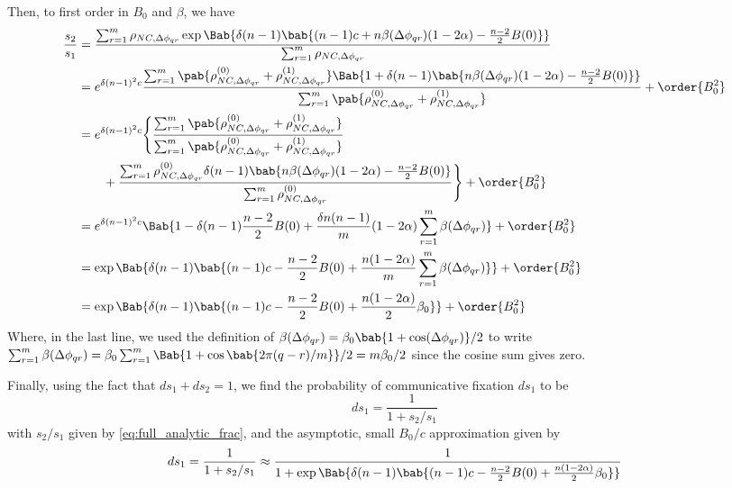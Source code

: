 Then, to first order in $B_0$ and $\beta$,
we have
\begin{align*}
  \frac{s_2}{s_1}
  &=
  \frac
  {\sum_{r=1}^{m} \rho_{NC,\Delta \phi_{qr}}
    \exp \Bab{
      \delta (n-1)
      \bab{
        (n-1) c + n \beta(\Delta \phi_{qr}) (1 - 2 \alpha)
        - \frac{n-2}{2} B(0)
      }
    }
  }
  {\sum_{r=1}^{m} \rho_{NC,\Delta \phi_{qr}}}
  \\
  &=
  e^{\delta (n-1)^2 c}
  \frac
  {\sum_{r=1}^{m}
    \pab{
      \rho_{NC,\Delta \phi_{qr}}^{(0)}
      +
      \rho_{NC,\Delta \phi_{qr}}^{(1)}
    }
    \Bab{1 +
      \delta (n-1)
      \bab{
        n \beta(\Delta \phi_{qr}) (1 - 2 \alpha)
        - \frac{n-2}{2} B(0)
      }
    }
  }
  {\sum_{r=1}^{m} \pab{
    \rho_{NC,\Delta \phi_{qr}}^{(0)}
    +
    \rho_{NC,\Delta \phi_{qr}}^{(1)}
  }}
  + \order{B_0^2}
  \\
  &=
  e^{\delta (n-1)^2 c}
  \Biggl\{
  \frac
  {\sum_{r=1}^{m}
    \pab{
      \rho_{NC,\Delta \phi_{qr}}^{(0)}
      +
      \rho_{NC,\Delta \phi_{qr}}^{(1)}
    }
  }
  {\sum_{r=1}^{m} \pab{
    \rho_{NC,\Delta \phi_{qr}}^{(0)}
    +
    \rho_{NC,\Delta \phi_{qr}}^{(1)}
  }}
  \\
  &\qquad
  +
  \frac
  {\sum_{r=1}^{m} \rho_{NC,\Delta \phi_{qr}}^{(0)}
    \delta (n-1)
    \bab{
      n \beta(\Delta \phi_{qr}) (1 - 2 \alpha)
      - \frac{n-2}{2} B(0)
    }
  }
  {\sum_{r=1}^{m} \rho_{NC,\Delta \phi_{qr}}^{(0)}
  }
  \Biggr\}
  + \order{B_0^2}
  \\
  &=
  e^{\delta (n-1)^2 c}
  \Bab{
    1
    - \delta (n-1) \frac{n-2}{2} B(0)
    +
    \frac{\delta n (n-1)}{m} (1 - 2 \alpha)
    \sum_{r=1}^{m} \beta(\Delta \phi_{qr})
  }
  + \order{B_0^2}
  \\
  &=
  \exp \Bab{\delta (n-1) \bab{
    (n-1) c
    - \frac{n-2}{2} B(0)
    +
    \frac{n (1 - 2 \alpha)}{m}
    \sum_{r=1}^{m} \beta(\Delta \phi_{qr})
  }}
  + \order{B_0^2}
  \\
  &=
  \exp \Bab{ \delta (n-1) \bab{
    (n-1) c
    - \frac{n-2}{2} B(0)
    +
    \frac{n (1 - 2 \alpha)}{2} \beta_0
  }}
  + \order{B_0^2}
\end{align*}
Where, in the last line, we used
the definition of
$\beta(\Delta \phi_{qr}) = \beta_0 \bab{1 + \cos(\Delta \phi_{qr})}/2$
to write
$\sum_{r=1}^m \beta(\Delta \phi_{qr})
= \beta_0 \sum_{r=1}^m \Bab{1 + \cos\bab{2 \pi (q-r)/m}}/2
= m \beta_0/2$
since the cosine sum gives zero.

Finally, using the fact that $d s_1 + d s_2 = 1$, we find the probability
of communicative fixation $d s_1$ to be
\begin{equation}
  d s_1 = \frac{1}{1 + s_2/s_1}
  \label{eq:full_analytic}
\end{equation}
with $s_2/s_1$ given by \cref{eq:full_analytic_frac},
and the asymptotic, small $B_0/c$ approximation given by
\begin{equation}
  d s_1 = \frac{1}{1 + s_2/s_1}
  \approx
  \frac{1}
  {1 + \exp \Bab{\delta (n-1) \bab{
    (n-1) c
    - \frac{n-2}{2} B(0)
    +
    \frac{n (1 - 2 \alpha)}{2} \beta_0
    }}
  }
  \label{eq:analytic_first_term}
\end{equation}
